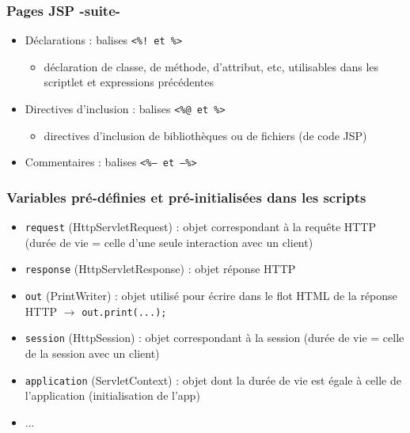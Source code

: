 \documentclass{beamer}
\begin{document}
\begin{frame}
  \frametitle{Pages JSP -suite-}
    \begin{itemize}  
  \item Déclarations : balises \texttt{<\%! et \%>}
    \begin{itemize}
    \item déclaration de classe, de méthode, d’attribut, etc,
      utilisables dans les scriptlet et expressions précédentes
    \end{itemize}
  \item Directives d'inclusion : balises \texttt{<\%@ et \%>}
    \begin{itemize}
    \item directives d'inclusion de bibliothèques ou de fichiers (de code JSP)
    \end{itemize}
  \item Commentaires : balises \texttt{<\%-- et --\%>}
  \end{itemize}
\end{frame}

\begin{frame}
  \frametitle{Variables pré-définies et pré-initialisées dans les scripts}
    \begin{itemize}  
    \item \texttt{request} (HttpServletRequest) : objet correspondant
      à la requête HTTP (durée de vie = celle d’une seule interaction
      avec un client)
    \item \texttt{response} (HttpServletResponse) : objet réponse HTTP
    \item \texttt{out} (PrintWriter) : objet utilisé pour écrire dans
      le flot HTML de la réponse HTTP $\rightarrow$ \texttt{out.print(...);}
    \item \texttt{session} (HttpSession) : objet correspondant à la
      session (durée de vie = celle de la session avec un client)
    \item \texttt{application} (ServletContext) : objet 
      dont la durée de vie est égale à celle de l’application (initialisation de l'app)
    \item ...
  \end{itemize}
\end{frame}
\end{document}
